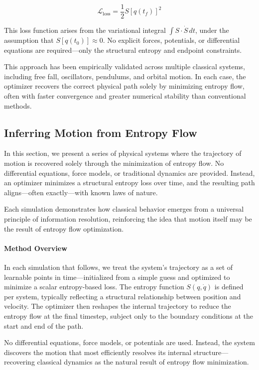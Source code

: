 \documentclass[12pt]{article}
\begin{document}
\[
\mathcal{L}_\text{loss} = \frac{1}{2} S[q(t_f)]^2
\]

This loss function arises from the variational integral \(\int S \cdot \dot{S} \, dt\), under the assumption that \(S[q(t_0)] \approx 0\). No explicit forces, potentials, or differential equations are required—only the structural entropy and endpoint constraints.

This approach has been empirically validated across multiple classical systems, including free fall, oscillators, pendulums, and orbital motion. In each case, the optimizer recovers the correct physical path solely by minimizing entropy flow, often with faster convergence and greater numerical stability than conventional methods.

\subsection{Inferring Motion from Entropy Flow}

In this section, we present a series of physical systems where the trajectory of motion is recovered solely through the minimization of entropy flow. No differential equations, force models, or traditional dynamics are provided. Instead, an optimizer minimizes a structural entropy loss over time, and the resulting path aligns—often exactly—with known laws of nature.

Each simulation demonstrates how classical behavior emerges from a universal principle of information resolution, reinforcing the idea that motion itself may be the result of entropy flow optimization.

\paragraph{Method Overview}

In each simulation that follows, we treat the system's trajectory as a set of learnable points in time—initialized from a simple guess and optimized to minimize a scalar entropy-based loss. The entropy function \( S(q, \dot{q}) \) is defined per system, typically reflecting a structural relationship between position and velocity. The optimizer then reshapes the internal trajectory to reduce the entropy flow at the final timestep, subject only to the boundary conditions at the start and end of the path.

No differential equations, force models, or potentials are used. Instead, the system discovers the motion that most efficiently resolves its internal structure—recovering classical dynamics as the natural result of entropy flow minimization.
\end{document}
